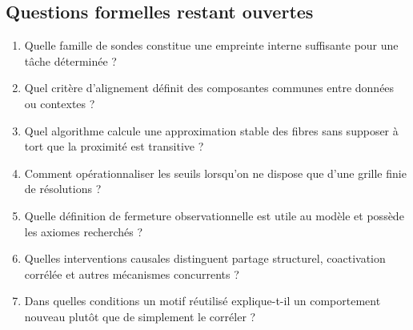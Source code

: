 \documentclass[11pt,a4paper]{article}
\theoremstyle{remark}
\newcommand{\1}{\mathbf 1}
\begin{document}
\subsection*{Questions formelles restant ouvertes}
\begin{enumerate}[label=\arabic*.]
  \item Quelle famille de sondes constitue une empreinte interne suffisante pour une tâche déterminée ?
  \item Quel critère d'alignement définit des composantes communes entre données ou contextes ?
  \item Quel algorithme calcule une approximation stable des fibres sans supposer à tort que la proximité est transitive ?
  \item Comment opérationnaliser les seuils lorsqu'on ne dispose que d'une grille finie de résolutions ?
  \item Quelle définition de fermeture observationnelle est utile au modèle et possède les axiomes recherchés ?
  \item Quelles interventions causales distinguent partage structurel, coactivation corrélée et autres mécanismes concurrents ?
  \item Dans quelles conditions un motif réutilisé explique-t-il un comportement nouveau plutôt que de simplement le corréler ?
\end{enumerate}
\end{document}
